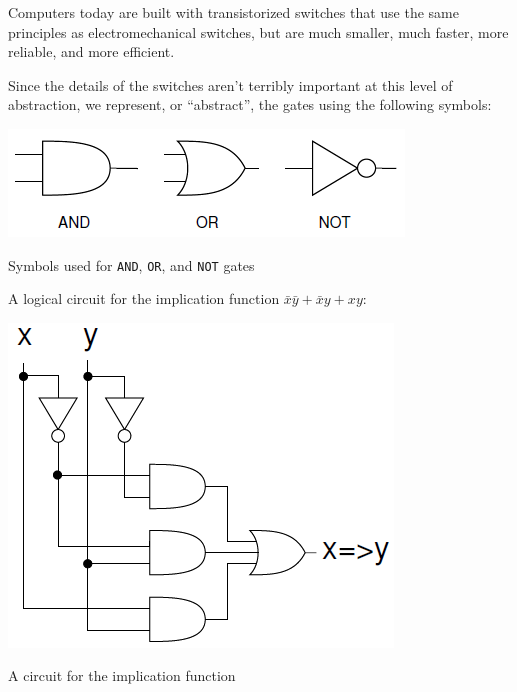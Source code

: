 \documentclass[8pt,a4paper,compress,handout]{beamer}
\begin{document}
\begin{frame}[fragile]
Computers today are built with transistorized switches that use the same principles as electromechanical switches, but are much smaller, much faster, more reliable, and more efficient. 

\bigskip

Since the details of the switches aren't terribly important at this level of abstraction, we represent, or ``abstract'', the gates using the following symbols:
\begin{center}
\includegraphics[scale=0.3]{figures/gate_symbols.png}

\smallskip

\tiny Symbols used for \lstinline{AND}, \lstinline{OR}, and \lstinline{NOT} gates
\end{center}

\bigskip

A logical circuit for the implication function $\bar{x}\bar{y}+\bar{x}y+xy$:
\begin{center}
\includegraphics[scale=0.22]{figures/implication_circuit.png}

\smallskip

\tiny A circuit for the implication function
\end{center}
\end{frame}
\end{document}
